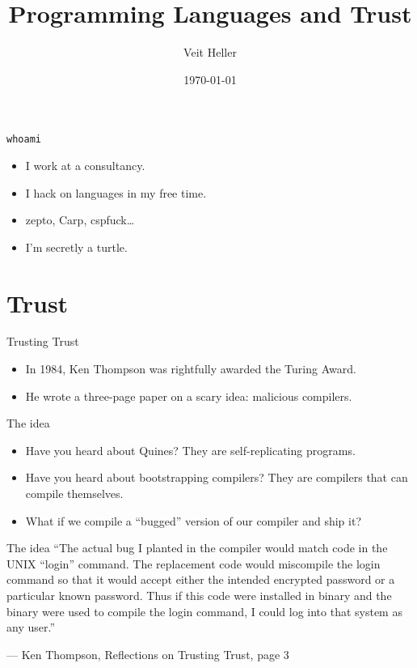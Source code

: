\documentclass[aspectratio=169]{beamer}
\title{Programming Languages and Trust}
\date{\today}
\author{Veit Heller}
\institute{Internet Security Meetup Berlin}
\begin{document}
  \maketitle
  \begin{frame}{\texttt{whoami}}
    \begin{itemize}
      \item I work at a consultancy.
      \item I hack on languages in my free time.
      \item zepto, Carp, cspfuck\ldots
      \item I’m secretly a turtle.
    \end{itemize}
  \end{frame}
  \section{Trust}
  \begin{frame}{Trusting Trust}
    \begin{itemize}
      \item In 1984, Ken Thompson was rightfully awarded the Turing Award.
      \item He wrote a three-page paper on a scary idea: malicious compilers.
    \end{itemize}
  \end{frame}
  \begin{frame}{The idea}
    \begin{itemize}
      \item Have you heard about Quines? They are self-replicating programs.
      \item Have you heard about bootstrapping compilers? They are compilers
            that can compile themselves.
      \item What if we compile a “bugged” version of our compiler and ship it?
    \end{itemize}
  \end{frame}
  \begin{frame}{The idea}
    “The actual bug I planted in the compiler would match code in the UNIX
     “login” command.  The replacement code would miscompile the login
     command so that it would accept either the intended encrypted password
     or a particular known password. Thus if this code were installed in
     binary and the binary were used to compile the login command, I could
     log into that system as any user.”

     \indent — Ken Thompson, Reflections on Trusting Trust, page 3
  \end{frame}
\end{document}
